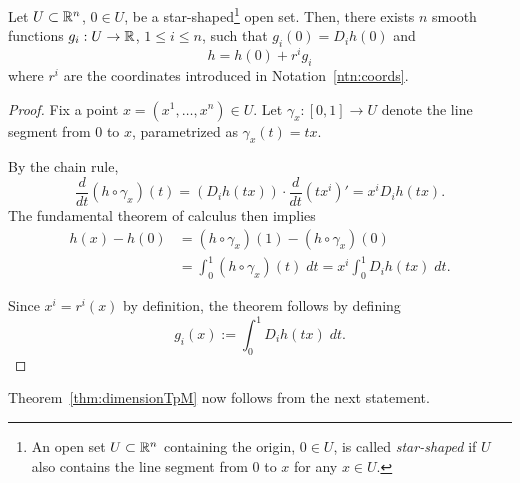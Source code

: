 \begin{lemma}\label{lem:Taylor}
  Let $U\subset\mathbb{R}^n$, $0\in U$, be a star-shaped\footnote{An open set $U\subset\mathbb{R}^n$ containing the origin, $0\in U$, is called \emph{star-shaped} if $U$ also contains the line segment from $0$ to $x$ for any $x\in U$.} open set.
  Then, there exists $n$ smooth functions $g_i: U \to \mathbb{R}$, $1\leq i \leq n$, such that $g_i(0) = D_i h(0)$ and
  \begin{equation}
    h = h(0) + r^i g_i
  \end{equation}
  where $r^i$ are the coordinates introduced in Notation~\ref{ntn:coords}.
\end{lemma}
\begin{proof}
  Fix a point $x = (x^1, \ldots, x^n) \in U$.
  Let $\gamma_x:[0,1]\to U$ denote the line segment from $0$ to $x$, parametrized as $\gamma_x(t) = tx$.

  By the chain rule,
  \begin{equation}
    \frac{d}{dt}(h \circ \gamma_x) (t) = \left(D_i h(t x)\right) \cdot \frac{d}{dt} (t x^i)' = x^i D_i h(t x).
  \end{equation}
  The fundamental theorem of calculus then implies
  \begin{align}
    h(x) - h(0) &= (h \circ \gamma_x)(1) - (h \circ \gamma_x)(0) \\
    &= \int_0^1 (h \circ \gamma_x)(t)\;dt = x^i \int_0^1 D_i h(tx)\; dt.
  \end{align}

  Since $x^i = r^i(x)$ by definition, the theorem follows by defining
  \begin{equation}
    g_i(x) := \int_0^1 D_i h(tx)\; dt.
  \end{equation}
\end{proof}

Theorem~\ref{thm:dimensionTpM} now follows from the next statement.

